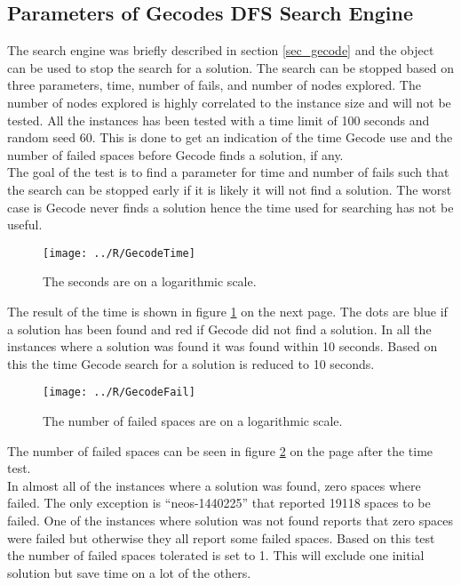 \subsection{Parameters of Gecodes DFS Search Engine}
The search engine was briefly described in section \ref{sec_gecode} and the  object can be used to 
stop the search for a solution. The search can be stopped based on three parameters, time, number of fails, and number 
of nodes explored. The number of nodes explored is highly correlated to the instance size and will not be tested. All 
the instances has been tested with a time limit of 100 seconds and random seed 60. This is done to get an indication 
of the time Gecode use and the number of failed spaces before Gecode finds a solution, if any. \\ 
The goal of the test is to find a parameter for time and number of fails such that the search can be stopped early if 
it is likely it will not find a solution. The worst case is Gecode never finds a solution hence the time used for 
searching has not be useful. \\
\begin{figure}[!h]
\centering
\texttt{[image: ../R/GecodeTime]} \caption{The seconds are on a logarithmic 
scale.}\label{fig_gecodetime}
\end{figure}\noindent
The result of the time is shown in figure \ref{fig_gecodetime} on the next page. The dots are blue if a solution has 
been found and red if Gecode did not find a solution. In all the instances where a solution was found it was found 
within 10 seconds. Based on this the time Gecode search for a solution is reduced to 10 seconds. \\ 
\begin{figure}[!h]
\centering
\texttt{[image: ../R/GecodeFail]} \caption{The number of failed spaces are on a logarithmic 
scale.}\label{fig_gecodefail}
\end{figure}\noindent
The number of failed spaces can be seen in figure \ref{fig_gecodefail} on the page after the time test. \\ 
In almost all of the instances where a solution was found, zero spaces where failed. The only exception is 
``neos-1440225'' that reported 19118 spaces to be failed. One of the instances where solution was not found reports 
that zero spaces were failed but otherwise they all report some failed spaces. Based on this test the number of failed 
spaces tolerated is set to 1. This will exclude one initial solution but save time on a lot of the others. \\ 


